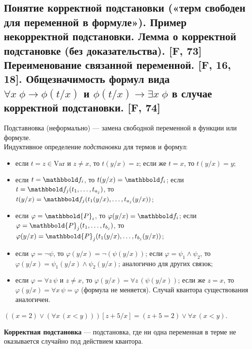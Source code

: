 \documentclass[a4paper, fleqn]{article}
\begin{document}
    \subsection{Понятие корректной подстановки («терм свободен для переменной в формуле»). Пример некорректной подстановки. Лемма о корректной подстановке (без доказательства). [F, 73] Переименование связанной переменной. [F, 16, 18]. Общезначимость формул вида $\forall x \; \phi \to \phi(t/x)$ и $\phi(t/x) \to \exists x \; \phi$ в случае корректной подстановки. [F, 74]}
    
    Подставновка (неформально) --- замена свободной переменной в функции или формуле.\\[-10 pt]
    
        Индуктивное определение \textit{подстановки} для термов и формул:\\[-25 pt]
        \begin{itemize}
            \item если $t = z \in \text{Var}$ и $z \ne x$, то $t(y/x) = z$; если же $t = x$, то $t(y/x) = y$;
            \item если $t = \F_i$, то $t(y/x) = \F_i$; если $t = \F_j(t_1, \ldots, t_{a_j})$, то $t(y/x) = \F_j(t_1(y/x), \ldots, t_{a_j}(y/x))$;
            \item если $\varphi = \mathbbold{P}_i$, то $\varphi(y/x) = \F_i$; если $\varphi = \mathbbold{P}_j(t_1, \ldots, t_{b_j})$, то $\varphi(y/x) = \mathbbold{P}_j(t_1(y/x), \ldots, t_{b_j}(y/x))$;
            \item если $\varphi = \neg\psi$, то $\varphi(y/x) = \neg(\psi(y/x))$; если $\varphi = \psi_1 \wedge \psi_2$, то $\varphi(y/x) = \psi_1(y/x) \wedge \psi_2(y/x)$; аналогично для других связок;
            \item если $\varphi = \forall z\, \psi$ и $z \ne x$, то $\varphi(y/x) = \forall z\, (\psi(y/x))$; если же $z = x$, то $\varphi(y/x) = \forall x\, \psi = \varphi$ (формула не меняется). Случай квантора существования аналогичен.
        \end{itemize}
    
    \begin{example} $((x = 2) \vee (\forall x\, (x < y)))[z+5/x] = (z+5 = 2) \vee \forall x\, (x < y)$. \end{example}
    
    \textbf{Корректная подстановка } --- подстановка, где ни одна переменная в терме не оказывается случайно под действием квантора.
    
\end{document}
